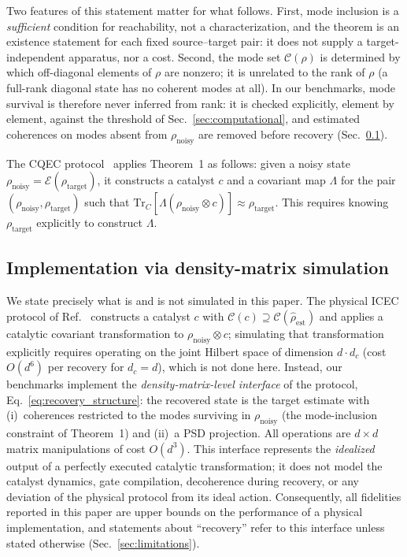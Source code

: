 \documentclass[a4paper,onecolumn]{quantumarticle}
\newcommand{\CC}{\mathcal{C}}
\newcommand{\EE}{\mathcal{E}}
\newcommand{\tr}{\mathrm{Tr}}
\newcommand{\rhot}{\rho_\mathrm{target}}
\newcommand{\rhon}{\rho_\mathrm{noisy}}
\newcommand{\rhoe}{\hat{\rho}_\mathrm{est}}
\begin{document}
Two features of this statement matter for what follows.
First, mode inclusion is a \emph{sufficient} condition for reachability, not a characterization, and the theorem is an existence statement for each fixed source--target pair: it does not supply a target-independent apparatus, nor a cost.
Second, the mode set $\CC(\rho)$ is determined by which off-diagonal elements of $\rho$ are nonzero; it is unrelated to the rank of $\rho$ (a full-rank diagonal state has no coherent modes at all).
In our benchmarks, mode survival is therefore never inferred from rank: it is checked explicitly, element by element, against the threshold of Sec.~\ref{sec:computational}, and estimated coherences on modes absent from $\rhon$ are removed before recovery (Sec.~\ref{sec:implementation}).

The CQEC protocol~\cite{Wakaura2026unified} applies Theorem~1 as follows: given a noisy state $\rhon = \EE(\rhot)$, it constructs a catalyst $c$ and a covariant map $\Lambda$ for the pair $(\rhon, \rhot)$ such that $\tr_C[\Lambda(\rhon \otimes c)] \approx \rhot$.
This requires knowing $\rhot$ explicitly to construct $\Lambda$.

\subsection{Implementation via density-matrix simulation}
\label{sec:implementation}

We state precisely what is and is not simulated in this paper.
The physical ICEC protocol of Ref.~\cite{Wakaura2026unified} constructs a catalyst $c$ with $\CC(c) \supseteq \CC(\rhoe)$ and applies a catalytic covariant transformation to $\rhon \otimes c$; simulating that transformation explicitly requires operating on the joint Hilbert space of dimension $d \cdot d_c$ (cost $O(d^6)$ per recovery for $d_c = d$), which is not done here.
Instead, our benchmarks implement the \emph{density-matrix-level interface} of the protocol, Eq.~\eqref{eq:recovery_structure}: the recovered state is the target estimate with (i)~coherences restricted to the modes surviving in $\rhon$ (the mode-inclusion constraint of Theorem~1) and (ii)~a PSD projection.
All operations are $d \times d$ matrix manipulations of cost $O(d^3)$.
This interface represents the \emph{idealized} output of a perfectly executed catalytic transformation; it does not model the catalyst dynamics, gate compilation, decoherence during recovery, or any deviation of the physical protocol from its ideal action.
Consequently, all fidelities reported in this paper are upper bounds on the performance of a physical implementation, and statements about ``recovery'' refer to this interface unless stated otherwise (Sec.~\ref{sec:limitations}).
\end{document}
